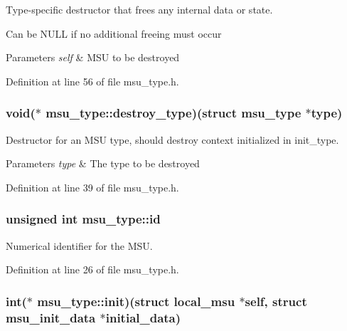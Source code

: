 Type-\/specific destructor that frees any internal data or state. 

Can be N\-U\-L\-L if no additional freeing must occur 
\begin{DoxyParams}{Parameters}
{\em self} & M\-S\-U to be destroyed \\
\hline
\end{DoxyParams}


Definition at line 56 of file msu\-\_\-type.\-h.

\hypertarget{structmsu__type_a4386613c175f4fa42c1ae5b5027246ce}{
\subsubsection[{destroy\-\_\-type}]{\setlength{\rightskip}{0pt plus 5cm}void($\ast$ msu\-\_\-type\-::destroy\-\_\-type)(struct {\bf msu\-\_\-type} $\ast$type)}}\label{structmsu__type_a4386613c175f4fa42c1ae5b5027246ce}


Destructor for an M\-S\-U type, should destroy context initialized in {\ttfamily init\-\_\-type}. 


\begin{DoxyParams}{Parameters}
{\em type} & The type to be destroyed \\
\hline
\end{DoxyParams}


Definition at line 39 of file msu\-\_\-type.\-h.

\hypertarget{structmsu__type_a0d626321555fed55c525a480dee99b83}{
\subsubsection[{id}]{\setlength{\rightskip}{0pt plus 5cm}unsigned int msu\-\_\-type\-::id}}\label{structmsu__type_a0d626321555fed55c525a480dee99b83}


Numerical identifier for the M\-S\-U. 



Definition at line 26 of file msu\-\_\-type.\-h.

\hypertarget{structmsu__type_af17ea5ed6d4071e62d80f545139fb425}{
\subsubsection[{init}]{\setlength{\rightskip}{0pt plus 5cm}int($\ast$ msu\-\_\-type\-::init)(struct {\bf local\-\_\-msu} $\ast$self, struct {\bf msu\-\_\-init\-\_\-data} $\ast$initial\-\_\-data)}}\label{structmsu__type_af17ea5ed6d4071e62d80f545139fb425}


